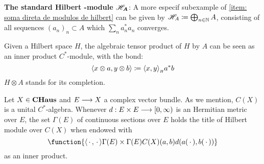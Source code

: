 \begin{exemplos}
\begin{itroman}
    \item \textbf{The standard Hilbert -module $\boldsymbol{\mathscr H_A}$}: A more especif subexample of \ref{item: soma direta de modulos de hilbert} can be given by $\mathscr H_A \coloneqq \bigoplus_{n\in \mathbb N} A$, consisting of all sequences $(a_n)_n \subset A$ which $\sum_n a_n^*a_n$ converges.
    \item \label{exemplo hilb (X) C*algebra} Given a Hilbert space $H$, the algebraic tensor product of $H$ by $A$ can be seen as an inner product $C^*$-module, with the bond:
    \[
    \inner {x\otimes a}{y\otimes b} \coloneqq \sub{\inner xy}H a^*b
    \]
    $H\otimes A$ stands for its completion.
    
    \item Let $X \in \boldsymbol{\operatorname{CHaus}}$ and $E\longrightarrow X$ a complex vector bundle. As we mention, $C(X)$ is a unital $C^*$-algebra. Whenever $d: E\times E \longrightarrow [0,\infty)$ is an Hermitian metric over $E$, the set $\Gamma (E)$ of continuous sections over $E$ holds the title of Hilbert module over $C(X)$ when endowed with
    \begin{equation*}
    \function{{\inner\come\come}{\Gamma(E)\times \Gamma(E)}{C(X)}{(a,b)}{d(a(\,\cdot\,),b(\,\cdot\,))}} 
    \end{equation*}
    as an inner product.

\end{itroman}
\end{exemplos}
%

